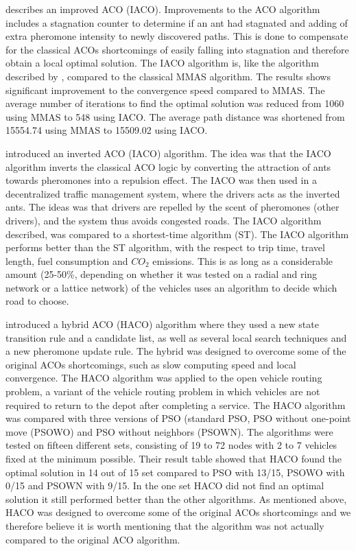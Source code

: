 \citet{jiang10} describes an improved ACO (IACO). Improvements to the ACO algorithm includes a stagnation counter to determine if an ant had stagnated and adding of extra pheromone intensity to newly discovered paths. This is done to compensate for the classical ACOs shortcomings of easily falling into stagnation and therefore obtain a local optimal solution. The IACO algorithm is, like the algorithm described by \citet{yang07}, compared to the classical MMAS algorithm. The results shows significant improvement to the convergence speed compared to MMAS. The average number of iterations to find the optimal solution was reduced from 1060 using MMAS to 548 using IACO. The average path distance was shortened from 15554.74 using MMAS to 15509.02 using IACO. 

\citet{dias14} introduced an inverted ACO (IACO) algorithm. The idea was that the IACO algorithm inverts the classical ACO logic by converting the attraction of ants towards pheromones into a repulsion effect. The IACO was then used in a decentralized traffic management system, where the drivers acts as the inverted ants. The ideas was that drivers are repelled by the scent of pheromones (other drivers), and the system thus avoids congested roads. The IACO algorithm described, was compared to a shortest-time algorithm (ST). The IACO algorithm performs better than the ST algorithm, with the respect to trip time, travel length, fuel consumption and $CO_2$ emissions. This is as long as a considerable amount (25-50\%, depending on whether it was tested on a radial and ring network or a lattice network) of the vehicles uses an algorithm to decide which road to choose. 

\citet{sedighpour14} introduced a hybrid ACO (HACO) algorithm where they used a new state transition rule and a candidate list, as well as several local search techniques and a new pheromone update rule. The hybrid was designed to overcome some of the original ACOs shortcomings, such as slow computing speed and local convergence. The HACO algorithm was applied to the open vehicle routing problem, a variant of the vehicle routing problem in which vehicles are not required to return to the depot after completing a service. The HACO algorithm was compared with three versions of PSO (standard PSO, PSO without one-point move (PSOWO) and PSO without neighbors (PSOWN). The algorithms were tested on fifteen different sets, consisting of 19 to 72 nodes with 2 to 7 vehicles fixed at the minimum possible. Their result table showed that HACO found the optimal solution in 14 out of 15 set compared to PSO with 13/15, PSOWO with 0/15 and PSOWN with 9/15. In the one set HACO did not find an optimal solution it still performed better than the other algorithms. As mentioned above, HACO was designed to overcome some of the original ACOs shortcomings and we therefore believe it is worth mentioning that the algorithm was not actually compared to the original ACO algorithm. 

